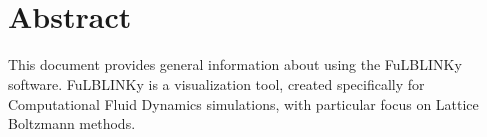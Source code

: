 \documentclass[
12pt, %
a4paper, %
oneside, %
headinclude,footinclude, %
BCOR5mm, %
]{scrartcl}
\title{\normalfont\spacedallcaps{F\MakeLowercase{u}LBLINK\MakeLowercase{y}} \\
\normalfont\spacedallcaps{User Guide}}%
\begin{document}
\newcommand{\titlebox}[2]{
\begin{tikzpicture}
\node[draw,thick,inner sep=6mm] (titlebox) {#2};
\node[fill=white] (Title) at (titlebox.north) {\bfseries \large #1};
\end{tikzpicture}
}
\renewcommand{\sectionmark}[1]{\markright{\spacedlowsmallcaps{#1}}} %

\newcommand{\titledframe}[2]{%
       \boxput*(0,1){\psframebox*{#1}}%
         {\psframebox[framesep=12pt]{#2}}}
         
\pagestyle{scrheadings} %



\maketitle %

\setcounter{tocdepth}{2} %

\tableofcontents %




\section*{Abstract} %
This document provides general information about using the FuLBLINKy software. FuLBLINKy is a visualization tool, created specifically for Computational Fluid Dynamics simulations, with particular focus on Lattice Boltzmann methods.
\end{document}
